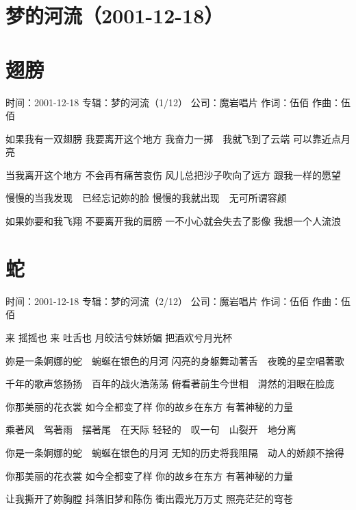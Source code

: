\documentclass[UTF8,a4paper,oneside,twocolumn,12pt]{ctexbook}
\newcommand{\infopair}[2]{\textbullet #1：#2}
\newcommand{\zc}[1][伍佰]{\infopair{作词}{#1}}
\newcommand{\zq}[1][伍佰]{\infopair{作曲}{#1}}
\newcommand{\zj}[1]{\infopair{专辑}{#1}}
\newcommand{\sj}[1]{\infopair{时间}{#1}}
\newcommand{\gs}[1]{\infopair{公司}{#1}}
\newenvironment{info}{\begin{flushleft}\kaishu
	}
	{\end{flushleft}\normalsize\yahei\par}
\newenvironment{lyric}{
	}
{}
\begin{document}
\section*{梦的河流（2001-12-18）}

\section{翅膀}
\begin{info}
	\sj{2001-12-18}
	\zj{梦的河流（1/12）}
	\gs{魔岩唱片}
	\zc
	\zq
\end{info}
\begin{lyric}
	如果我有一双翅膀
	我要离开这个地方
	我奋力一掷　我就飞到了云端
	可以靠近点月亮

	当我离开这个地方
	不会再有痛苦哀伤
	风儿总把沙子吹向了远方
	跟我一样的愿望

	慢慢的当我发现　已经忘记妳的脸
	慢慢的我就出现　无可所谓容颜

	如果妳要和我飞翔
	不要离开我的肩膀
	一不小心就会失去了影像
	我想一个人流浪
\end{lyric}

\section{蛇}
\begin{info}
	\sj{2001-12-18}
	\zj{梦的河流（2/12）}
	\gs{魔岩唱片}
	\zc
	\zq
\end{info}
\begin{lyric}
	来 摇摇也
	来 吐舌也
	月皎洁兮妹娇媚
	把酒欢兮月光杯

	妳是一条婀娜的蛇　蜿蜒在银色的月河
	闪亮的身躯舞动著舌　夜晚的星空唱著歌

	千年的歌声悠扬扬　百年的战火浩荡荡
	俯看著前生今世相　潸然的泪眼在脸庞

	你那美丽的花衣裳
	如今全都变了样
	你的故乡在东方
	有著神秘的力量

	乘著风　驾著雨　摆著尾　在天际
	轻轻的　叹一句　山裂开　地分离

	你是一条婀娜的蛇　蜿蜒在银色的月河
	无知的历史将我阻隔　动人的娇颜不捨得

	你那美丽的花衣裳
	如今全都变了样
	你的故乡在东方
	有著神秘的力量

	让我撕开了妳胸膛
	抖落旧梦和陈伤
	衝出霞光万万丈
	照亮茫茫的穹苍
\end{lyric}
\end{document}
